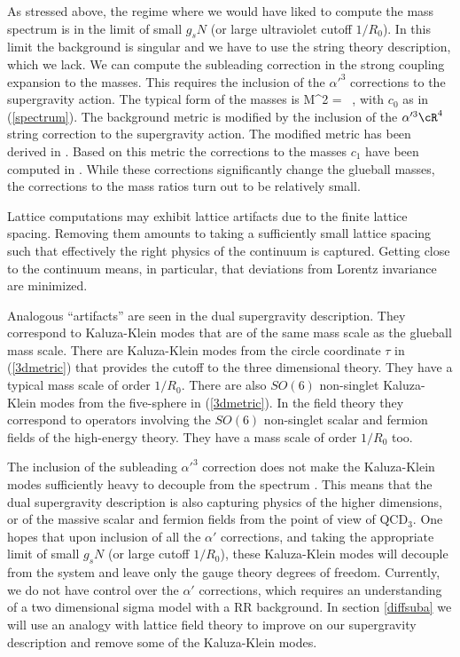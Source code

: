 As stressed above, the regime where we would have liked to compute the
mass spectrum is in the limit of small $g_s N$ (or large ultraviolet
cutoff $1/R_0$).  In this limit the background is singular and we have
to use the string theory description,  which we lack.  We can compute
the subleading correction in the strong coupling expansion to the
masses. This requires the inclusion of the $\alpha'^3$ corrections to
the supergravity action.  The typical form of the masses is
\beq
M^2 =   \ ,
\eeq
with $c_0$ as in (\ref{spectrum}).
The background metric is modified by the inclusion of the $\alpha'^3 \cR^4$
string correction to the supergravity action. The modified
metric has been derived in
\cite{Gubser:1998nz,Pawelczyk:1998pb}.
Based on this metric
the corrections to the masses $c_1$ have been computed in \cite{Csaki:1998gm}.
While these corrections significantly change the glueball masses, 
the corrections to the
mass ratios turn out to be relatively small.

Lattice computations may exhibit lattice artifacts due to the finite
lattice spacing. Removing them amounts to taking a sufficiently small
lattice spacing such that effectively the right physics of the
continuum is captured. Getting close to the continuum means, in
particular, that deviations from Lorentz invariance are minimized.

Analogous ``artifacts'' are seen in the dual supergravity description.
They correspond to Kaluza-Klein modes that are of the same mass scale
as the glueball mass scale.  There are Kaluza-Klein modes from the
circle coordinate $\tau$ in (\ref{3dmetric}) that provides the cutoff
to the three dimensional theory.  They have a typical mass scale of
order $1/R_0$.  There are also $SO(6)$ non-singlet Kaluza-Klein modes
from the five-sphere in (\ref{3dmetric}). In the field theory they
correspond to operators involving the $SO(6)$ non-singlet scalar and
fermion fields of the high-energy theory. They have a mass scale of
order $1/R_0$ too.


The inclusion of the subleading $\alpha'^3$ correction does not make
the Kaluza-Klein modes sufficiently heavy to decouple from the
spectrum \cite{Ooguri:1998ga,Csaki:1998gm}.  This means that the dual
supergravity description is also capturing physics of the higher
dimensions, or of the massive scalar and fermion fields from the point
of view of QCD$_3$.  One hopes that upon inclusion of all the
$\alpha'$ corrections, and taking the appropriate limit of small
$g_sN$ (or large cutoff $1/R_0$), these Kaluza-Klein modes will
decouple from the system and leave only the gauge theory degrees of
freedom.  Currently, we do not have control over the $\alpha'$
corrections, which requires an understanding of a two dimensional sigma
model with a RR background.  In section \ref{diffsuba} 
we will use an analogy with
lattice field theory to improve on our supergravity description and
remove some of the Kaluza-Klein modes.


